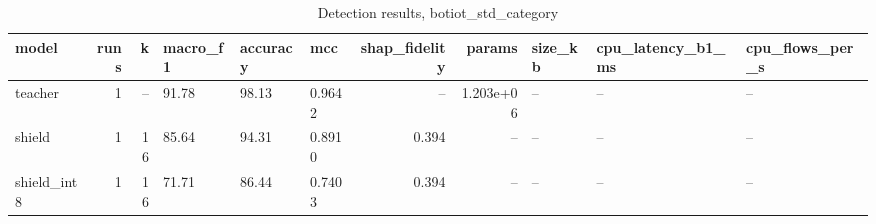 \begin{table}
\caption{Detection results, botiot_std_category}
\begin{tabular}{lrrlllrrlll}
\toprule
model & runs & k & macro_f1 & accuracy & mcc & shap_fidelity & params & size_kb & cpu_latency_b1_ms & cpu_flows_per_s \\
\midrule
teacher & 1 & -- & 91.78 & 98.13 & 0.9642 & -- & 1.203e+06 & -- & -- & -- \\
shield & 1 & 16 & 85.64 & 94.31 & 0.8910 & 0.394 & -- & -- & -- & -- \\
shield_int8 & 1 & 16 & 71.71 & 86.44 & 0.7403 & 0.394 & -- & -- & -- & -- \\
\bottomrule
\end{tabular}
\end{table}
